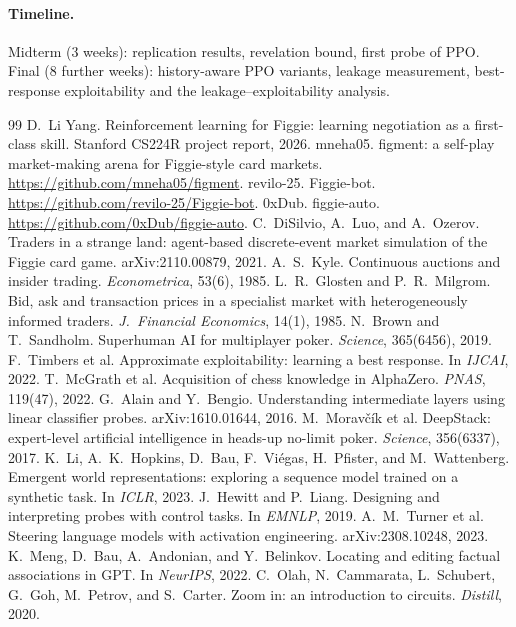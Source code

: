 \documentclass{article}
\begin{document}
\paragraph{Timeline.}
Midterm (3 weeks): replication results, revelation bound, first probe of PPO.
Final (8 further weeks): history-aware PPO variants, leakage measurement, best-response exploitability and the leakage--exploitability analysis.

\begin{thebibliography}{99}
 D.~Li Yang. \newblock Reinforcement learning for Figgie: learning negotiation as a first-class skill. \newblock Stanford CS224R project report, 2026.
 mneha05. \newblock figment: a self-play market-making arena for Figgie-style card markets. \newblock \url{https://github.com/mneha05/figment}.
 revilo-25. \newblock Figgie-bot. \newblock \url{https://github.com/revilo-25/Figgie-bot}.
 0xDub. \newblock figgie-auto. \newblock \url{https://github.com/0xDub/figgie-auto}.
 C.~DiSilvio, A.~Luo, and A.~Ozerov. \newblock Traders in a strange land: agent-based discrete-event market simulation of the Figgie card game. \newblock arXiv:2110.00879, 2021.
 A.~S.~Kyle. \newblock Continuous auctions and insider trading. \newblock \emph{Econometrica}, 53(6), 1985.
 L.~R.~Glosten and P.~R.~Milgrom. \newblock Bid, ask and transaction prices in a specialist market with heterogeneously informed traders. \newblock \emph{J.\ Financial Economics}, 14(1), 1985.
 N.~Brown and T.~Sandholm. \newblock Superhuman AI for multiplayer poker. \newblock \emph{Science}, 365(6456), 2019.
 F.~Timbers et al. \newblock Approximate exploitability: learning a best response. \newblock In \emph{IJCAI}, 2022.
 T.~McGrath et al. \newblock Acquisition of chess knowledge in AlphaZero. \newblock \emph{PNAS}, 119(47), 2022.
 G.~Alain and Y.~Bengio. \newblock Understanding intermediate layers using linear classifier probes. \newblock arXiv:1610.01644, 2016.
 M.~Morav\v{c}\'{i}k et al. \newblock DeepStack: expert-level artificial intelligence in heads-up no-limit poker. \newblock \emph{Science}, 356(6337), 2017.
 K.~Li, A.~K.~Hopkins, D.~Bau, F.~Vi\'egas, H.~Pfister, and M.~Wattenberg. \newblock Emergent world representations: exploring a sequence model trained on a synthetic task. \newblock In \emph{ICLR}, 2023.
 J.~Hewitt and P.~Liang. \newblock Designing and interpreting probes with control tasks. \newblock In \emph{EMNLP}, 2019.
 A.~M.~Turner et al. \newblock Steering language models with activation engineering. \newblock arXiv:2308.10248, 2023.
 K.~Meng, D.~Bau, A.~Andonian, and Y.~Belinkov. \newblock Locating and editing factual associations in GPT. \newblock In \emph{NeurIPS}, 2022.
 C.~Olah, N.~Cammarata, L.~Schubert, G.~Goh, M.~Petrov, and S.~Carter. \newblock Zoom in: an introduction to circuits. \newblock \emph{Distill}, 2020.
\end{thebibliography}
\end{document}
